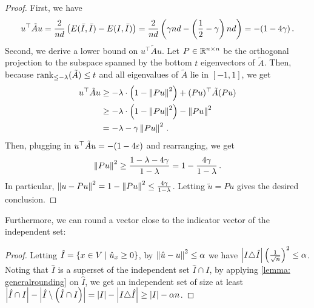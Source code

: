 \begin{proof}
    First, we have 
    \[u^\top \tilde{A} u = \frac{2}{nd} \left( E(\bar{I}, \bar{I}) - E(I, \bar{I}) \right) = \frac{2}{nd} \left(\gamma n d - \left(\frac{1}{2}-\gamma\right)nd \right) = -(1-4\gamma)\,.\]
    Second, we derive a lower bound on $u^\top \tilde{A} u$.
    Let $P \in {\mathbb R}^{n \times n}$ be the orthogonal projection to the subspace spanned by the bottom $t$ eigenvectors of $\tilde{A}$.
    Then, because $\operatorname{rank}_{\leq -\lambda}(\tilde{A}) \leq t$ and all eigenvalues of $\tilde{A}$ lie in $[-1, 1]$, we get
    \begin{align*}
    u^\top \tilde{A} u
    &\geq -\lambda \cdot \left(1-\left\lVert Pu\right\rVert^2\right) + (Pu)^\top \tilde{A} (Pu)\\
    &\geq -\lambda \cdot \left(1-\left\lVert Pu\right\rVert^2\right) - \left\lVert Pu\right\rVert^2\\
    &= -\lambda - \gamma \left\lVert Pu\right\rVert^2\,.
    \end{align*}
    Then, plugging in $u^\top \tilde{A} u = -(1-4\varepsilon)$ and rearranging, we get
    \[\left\lVert Pu\right\rVert^2 \geq \frac{1-\lambda-4\gamma}{1-\lambda} = 1 - \frac{4\gamma}{1-\lambda}\,.\]
    In particular, $\left\lVert u - Pu\right\rVert^2 = 1 - \left\lVert Pu\right\rVert^2 \leq \frac{4\gamma}{1-\lambda}$.
    Letting $\tilde{u} = Pu$ gives the desired conclusion.
\end{proof}

Furthermore, we can round a vector close to the indicator vector of the independent set:
\begin{proof}
    Letting $\hat{I} = \left\{x \in V \mid \hat{u}_x \geq 0\right\}$, by $\left\lVert\hat{u}-u\right\rVert^2\leq \alpha$ we have $\left\lvert I\triangle \hat{I}\right\rvert\left(\frac{1}{\sqrt{n}}\right)^2\leq \alpha$.
    Noting that $\hat{I}$ is a superset of the independent set $\hat{I}\cap I$, by applying \cref{lemma: generalrounding} on $\hat{I}$, we get an independent set of size at least $\left\lvert\hat{I}\cap I\right\rvert - \left\lvert\hat{I}\setminus \left(\hat{I}\cap I\right)\right\rvert=\left\lvert I\right\rvert - \left\lvert I\triangle \hat{I}\right\rvert\geq \left\lvert I\right\rvert - \alpha n$.
\end{proof}

